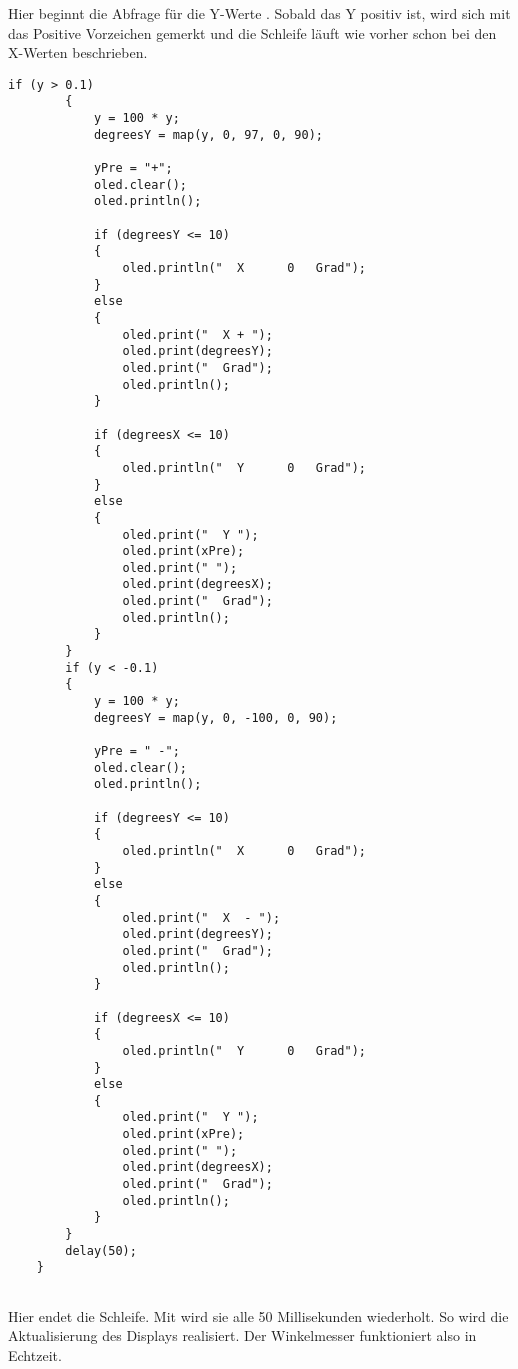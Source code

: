     
Hier beginnt die Abfrage für die Y-Werte . Sobald das Y positiv ist, wird sich mit  das Positive Vorzeichen gemerkt und die Schleife läuft wie vorher schon bei den X-Werten beschrieben.
    
    \begin{lstlisting}[language=Arduino]
        if (y > 0.1) 
        {
            y = 100 * y;
            degreesY = map(y, 0, 97, 0, 90);
            
            yPre = "+";
            oled.clear();
            oled.println();
            
            if (degreesY <= 10) 
            {
                oled.println("  X      0   Grad");
            } 
            else 
            {
                oled.print("  X + ");
                oled.print(degreesY);
                oled.print("  Grad");
                oled.println();
            }
            
            if (degreesX <= 10) 
            {
                oled.println("  Y      0   Grad");
            } 
            else 
            {
                oled.print("  Y ");
                oled.print(xPre);
                oled.print(" ");
                oled.print(degreesX);
                oled.print("  Grad");
                oled.println();
            }
        }
        if (y < -0.1) 
        {
            y = 100 * y;
            degreesY = map(y, 0, -100, 0, 90);
            
            yPre = " -";
            oled.clear();
            oled.println();
            
            if (degreesY <= 10) 
            {
                oled.println("  X      0   Grad");
            } 
            else 
            {
                oled.print("  X  - ");
                oled.print(degreesY);
                oled.print("  Grad");
                oled.println();
            }
            
            if (degreesX <= 10) 
            {
                oled.println("  Y      0   Grad");
            } 
            else 
            {
                oled.print("  Y ");
                oled.print(xPre);
                oled.print(" ");
                oled.print(degreesX);
                oled.print("  Grad");
                oled.println();
            }
        }
        delay(50);
    }
    
\end{lstlisting}

Hier endet die Schleife. Mit  wird sie alle 50 Millisekunden wiederholt. So wird die Aktualisierung des Displays realisiert. Der Winkelmesser funktioniert also in Echtzeit.



